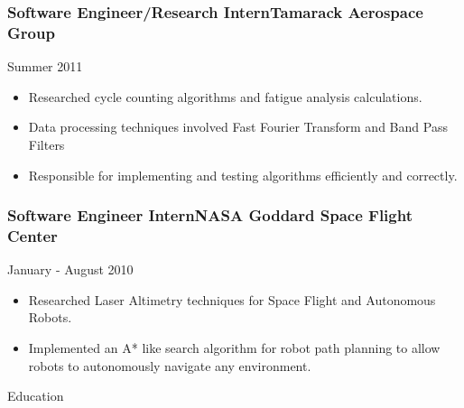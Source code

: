 \documentclass[9pt]{article}
\newenvironment{changemargin}[2]{%
  \begin{list}{}{%
    \setlength{\topsep}{0pt}%
    \setlength{\leftmargin}{#1}%
    \setlength{\rightmargin}{#2}%
    \setlength{\listparindent}{\parindent}%
    \setlength{\itemindent}{\parindent}%
    \setlength{\parsep}{\parskip}%
  }%
  \item[]}{\end{list}
}
\newcommand{\lineover}{
    \begin{changemargin}{-0.05in}{-0.05in}
        \vspace*{-8pt}
        \hrulefill \\
        \vspace*{-2pt}
    \end{changemargin}
}
\newcommand{\header}[1]{
    \begin{changemargin}{-0.5in}{-0.5in}
        {\large #1}\\
        \lineover
    \end{changemargin}
}
\newenvironment{body} {
    \vspace*{-16pt}
    \begin{changemargin}{-0.20in}{-0.5in}
  }
    {\end{changemargin}
}
\newenvironment{jobdescriptionlist}[3]{
  \subsubsection*{#1\hfill\small#2}
  \small
  \vspace*{-5pt}
  {\hfill #3}
  \vspace*{-10pt}
  \begin{itemize}
   \setlength{\topsep}{0pt}
   \setlength{\itemsep}{1pt}
   \setlength{\parskip}{0pt}
   \setlength{\parsep}{0pt}
}{\end{itemize}\vspace*{-3pt}\normalsize}
\begin{document}
\begin{body}
    \begin{jobdescriptionlist}{Software Engineer/Research Intern}{Tamarack Aerospace Group}{Summer 2011}
        \item Researched cycle counting algorithms and fatigue analysis calculations.
        \item Data processing techniques involved Fast Fourier Transform and Band Pass Filters
        \item Responsible for implementing and testing algorithms efficiently and correctly.
    \end{jobdescriptionlist}


    \begin{jobdescriptionlist}{Software Engineer Intern}{NASA Goddard Space Flight Center}{January - August 2010}
        \item Researched Laser Altimetry techniques for Space Flight and Autonomous Robots.
        \item Implemented an A* like search algorithm for robot path planning to allow robots to autonomously navigate any environment.
    \end{jobdescriptionlist}



\end{body}

\vspace*{11pt}
\smallskip


\header{Education}
\end{document}
